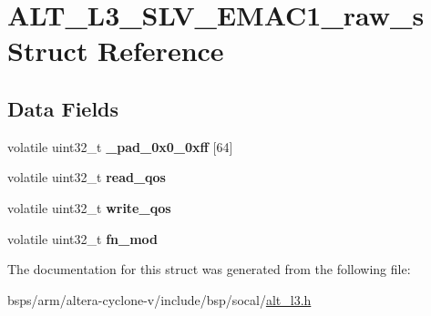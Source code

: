 \hypertarget{structALT__L3__SLV__EMAC1__raw__s}{}\section{A\+L\+T\+\_\+\+L3\+\_\+\+S\+L\+V\+\_\+\+E\+M\+A\+C1\+\_\+raw\+\_\+s Struct Reference}
\label{structALT__L3__SLV__EMAC1__raw__s}
\subsection*{Data Fields}
\begin{DoxyCompactItemize}
\item 
\mbox{\label{structALT__L3__SLV__EMAC1__raw__s_a924aac32c2794372ad4230a0f21c654e}} 
volatile uint32\+\_\+t {\bfseries \+\_\+pad\+\_\+0x0\+\_\+0xff} \mbox{[}64\mbox{]}
\item 
\mbox{\label{structALT__L3__SLV__EMAC1__raw__s_aa7f548bd314b0d14ade6a86045d541da}} 
volatile uint32\+\_\+t {\bfseries read\+\_\+qos}
\item 
\mbox{\label{structALT__L3__SLV__EMAC1__raw__s_ab7c0ca835bda7fcddc726accfaf09987}} 
volatile uint32\+\_\+t {\bfseries write\+\_\+qos}
\item 
\mbox{\label{structALT__L3__SLV__EMAC1__raw__s_a7fc01498abc5fc91fba49c9a6d72a679}} 
volatile uint32\+\_\+t {\bfseries fn\+\_\+mod}
\end{DoxyCompactItemize}


The documentation for this struct was generated from the following file\+:\begin{DoxyCompactItemize}
\item 
bsps/arm/altera-\/cyclone-\/v/include/bsp/socal/\mbox{\hyperlink{alt__l3_8h}{alt\+\_\+l3.\+h}}\end{DoxyCompactItemize}
